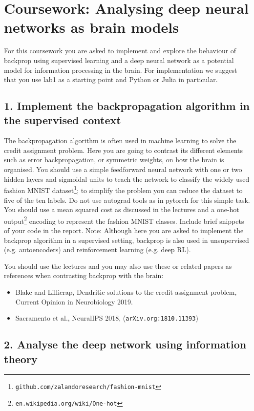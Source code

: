 \documentclass[12pt]{article}
\begin{document}
\section*{Coursework: Analysing deep neural networks as brain models}

For this coursework you are asked to implement and explore the
behaviour of backprop using supervised learning and a deep neural
network as a potential model for information processing in the
brain. For implementation we suggest that you use lab1 as a starting
point and Python or Julia in particular.

\subsection*{1. Implement the backpropagation algorithm in the supervised context}

The backpropagation algorithm is often used in machine learning to
solve the credit assignment problem. Here you are going to contrast
its different elements such as error backpropagation, or symmetric
weights, on how the brain is organised. You should use a simple
feedforward neural network with one or two hidden layers and sigmoidal
units to teach the network to classify the widely used fashion MNIST
dataset\footnote{\texttt{github.com/zalandoresearch/fashion-mnist}}; to
simplify the problem you can reduce the dataset to five of the ten
labels. Do not use autograd tools as in pytorch for this simple
task. You should use a mean squared cost as discussed in the lectures
and a one-hot output\footnote{\texttt{en.wikipedia.org/wiki/One-hot}}
encoding to represent the fashion MNIST classes.  Include brief
snippets of your code in the report. Note: Although here you are asked
to implement the backprop algorithm in a supervised setting, backprop
is also used in unsupervised (e.g. autoencoders) and reinforcement
learning (e.g. deep RL).

You should use the lectures and you may also use these or related
papers as references when contrasting backprop with the brain:

\begin{itemize}
\item Blake and Lillicrap, Dendritic solutions to the credit
  assignment problem, Current Opinion in Neurobiology 2019.
\item Sacramento et al., NeuralIPS 2018,
  (\texttt{arXiv.org:1810.11393})
\end{itemize}
 
\subsection*{2. Analyse the deep network using information theory}
\end{document}
